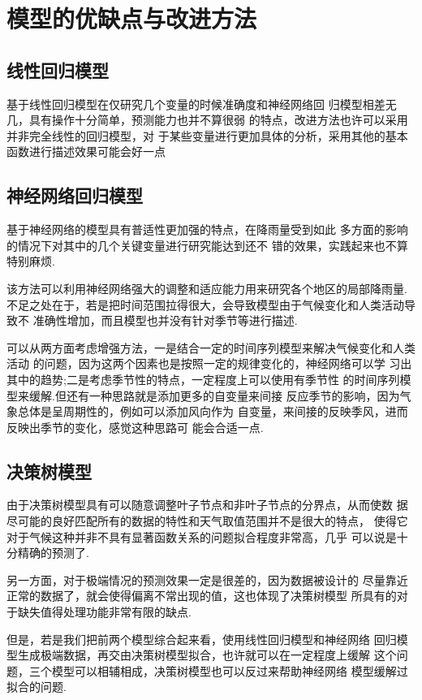 \documentclass[UTF8, a4paper]{ctexart}
\begin{document}
\section{模型的优缺点与改进方法}

\subsection{线性回归模型}
基于线性回归模型在仅研究几个变量的时候准确度和神经网络回
归模型相差无几，具有操作十分简单，预测能力也并不算很弱
的特点，改进方法也许可以采用并非完全线性的回归模型，对
于某些变量进行更加具体的分析，采用其他的基本函数进行描述效果可能会好一点

\subsection{神经网络回归模型}
基于神经网络的模型具有普适性更加强的特点，在降雨量受到如此
多方面的影响的情况下对其中的几个关键变量进行研究能达到还不
错的效果，实践起来也不算特别麻烦.

该方法可以利用神经网络强大的调整和适应能力用来研究各个地区的局部降雨量.
不足之处在于，若是把时间范围拉得很大，会导致模型由于气候变化和人类活动导致不
准确性增加，而且模型也并没有针对季节等进行描述.

可以从两方面考虑增强方法，一是结合一定的时间序列模型来解决气候变化和人类活动
的问题，因为这两个因素也是按照一定的规律变化的，神经网络可以学
习出其中的趋势;二是考虑季节性的特点，一定程度上可以使用有季节性
的时间序列模型来缓解.但还有一种思路就是添加更多的自变量来间接
反应季节的影响，因为气象总体是呈周期性的，例如可以添加风向作为
自变量，来间接的反映季风，进而反映出季节的变化，感觉这种思路可
能会合适一点.

\subsection{决策树模型}
由于决策树模型具有可以随意调整叶子节点和非叶子节点的分界点，从而使数
据尽可能的良好匹配所有的数据的特性和天气取值范围并不是很大的特点，
使得它对于气候这种并非不具有显著函数关系的问题拟合程度非常高，几乎
可以说是十分精确的预测了.

另一方面，对于极端情况的预测效果一定是很差的，因为数据被设计的
尽量靠近正常的数据了，就会使得偏离不常出现的值，这也体现了决策树模型
所具有的对于缺失值得处理功能非常有限的缺点.

但是，若是我们把前两个模型综合起来看，使用线性回归模型和神经网络
回归模型生成极端数据，再交由决策树模型拟合，也许就可以在一定程度上缓解
这个问题，三个模型可以相辅相成，决策树模型也可以反过来帮助神经网络
模型缓解过拟合的问题.
\end{document}
